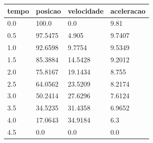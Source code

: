 \begin{tabular}{llll}
\toprule
tempo & posicao & velocidade & aceleracao \\
\midrule
0.0 & 100.0 & 0.0 & 9.81 \\
0.5 & 97.5475 & 4.905 & 9.7407 \\
1.0 & 92.6598 & 9.7754 & 9.5349 \\
1.5 & 85.3884 & 14.5428 & 9.2012 \\
2.0 & 75.8167 & 19.1434 & 8.755 \\
2.5 & 64.0562 & 23.5209 & 8.2174 \\
3.0 & 50.2414 & 27.6296 & 7.6124 \\
3.5 & 34.5235 & 31.4358 & 6.9652 \\
4.0 & 17.0643 & 34.9184 & 6.3 \\
4.5 & 0.0 & 0.0 & 0.0 \\
\bottomrule
\end{tabular}
